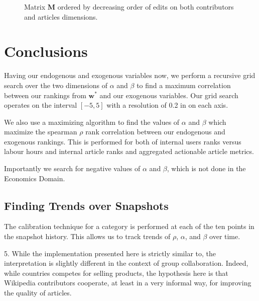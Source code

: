 \documentclass{acm_proc_article-sp}
\begin{document}
\begin{figure}
\centering
\caption{Matrix $\mathbf{M}$ ordered by decreasing order of edits on both contributors and articles dimensions.}
\label{fig:matrix}
\end{figure}

\section{Conclusions}


%
Having our endogenous and exogenous variables now, we perform a recursive grid search over the two dimensions of $\alpha$ and $\beta$ to find a maximum correlation between our rankings from $\mathbf{w^*}$ and our exogenous variables. Our grid search operates on the interval $[-5,5]$ with a resolution of 0.2 in on each axis.


We also use a maximizing algorithm to find the values of $\alpha$ and $\beta$ which maximize the spearman $\rho$ rank correlation between our endogenous and exogenous rankings. This is performed for both of internal users ranks versus labour hours and internal article ranks and aggregated actionable article metrics.

Importantly we search for negative values of $\alpha$ and $\beta$, which is not done in the Economics Domain.

\subsection{Finding Trends over Snapshots}

The calibration technique for a category is performed at each of the ten points in the snapshot history. This allows us to track trends of $\rho$, $\alpha$, and $\beta$ over time.



5. While the implementation presented here is strictly similar to, the interpretation is slightly different in the context of group collaboration. Indeed, while countries competes for selling products, the hypothesis here is that Wikipedia contributors cooperate, at least in a very informal way, for improving the quality of articles.
\end{document}
